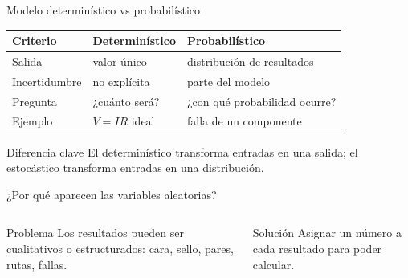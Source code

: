\documentclass[aspectratio=169,11pt]{beamer}
\begin{document}
\begin{frame}{Modelo determinístico vs probabilístico}
\small
\begin{center}
\begin{tabular}{p{}p{}p{}}
\toprule
Criterio & Determinístico & Probabilístico \\
\midrule
Salida & valor único & distribución de resultados \\
Incertidumbre & no explícita & parte del modelo \\
Pregunta & ¿cuánto será? & ¿con qué probabilidad ocurre? \\
Ejemplo & $V=IR$ ideal & falla de un componente \\
\bottomrule
\end{tabular}
\end{center}
\begin{alertblock}{Diferencia clave}
El determinístico transforma entradas en una salida; el estocástico transforma entradas en una distribución.
\end{alertblock}
\end{frame}

\begin{frame}{¿Por qué aparecen las variables aleatorias?}
\begin{columns}[T]
\begin{block}{Problema}
Los resultados pueden ser cualitativos o estructurados: cara, sello, pares, rutas, fallas.
\end{block}
\pause
\begin{exampleblock}{Solución}
Asignar un número a cada resultado para poder calcular.
\end{exampleblock}
\end{columns}
\end{frame}
\end{document}
